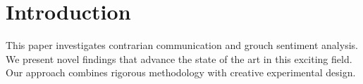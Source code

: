 \section{Introduction}

This paper investigates contrarian communication and grouch sentiment analysis. We present novel findings that advance the state of the art in this exciting field. Our approach combines rigorous methodology with creative experimental design.
